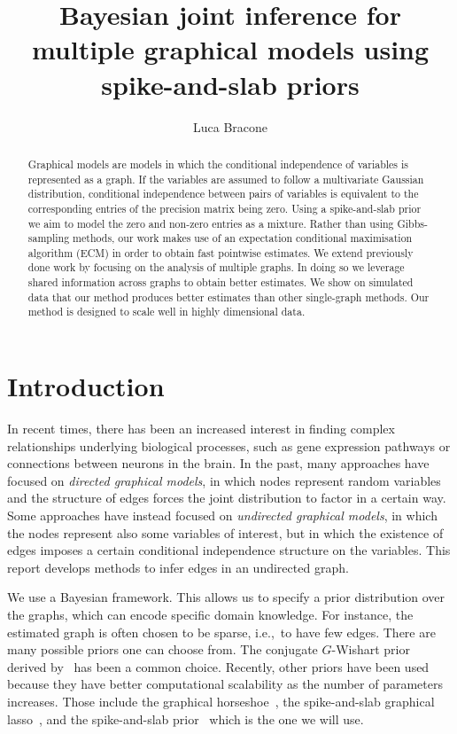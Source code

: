 \documentclass[a4paper, 11pt, oneside]{report}
\author{Luca Bracone}
\title{Bayesian joint inference for multiple graphical models using
	spike-and-slab priors}
\newcommand{\1}{\mathds{1}}
\begin{document}
\maketitle

\begin{abstract}
	Graphical models are models in which the conditional independence of
	variables is represented as a graph. If the variables are assumed to  follow
	a multivariate Gaussian distribution, conditional
	independence between pairs of variables is equivalent to the corresponding entries of the precision matrix being zero. Using a
	spike-and-slab prior we aim to model the zero and
	non-zero entries as a mixture. Rather than using Gibbs-sampling methods, our work makes
	use of an expectation conditional maximisation algorithm (ECM) in order to
	obtain fast pointwise estimates. We extend previously done work by focusing
	on the analysis of multiple graphs. In doing so we leverage shared
	information across graphs to obtain better estimates. We show on simulated
	data that our method produces better estimates than other single-graph
	methods. Our method is designed to scale well in highly dimensional data.

\end{abstract}

\chapter{Introduction}
In recent times, there has been an increased interest in finding complex
relationships underlying biological processes, such as gene expression pathways
or connections between neurons in the brain. In the past, many approaches have
focused on \emph{directed graphical models}, in which nodes represent random
variables and the structure of edges forces the joint distribution to factor in
a certain way. Some approaches have instead focused on \emph{undirected
	graphical models}, in which the nodes represent also some variables of interest, but
in which the existence of edges imposes a certain conditional independence
structure on the variables. This report develops methods to infer edges in an
undirected graph.

We use a Bayesian framework. This allows us to specify a prior distribution over the
graphs, which can encode specific domain knowledge. For instance, the estimated
graph is often chosen to be sparse, i.e.,\ to have few edges.
There are many possible priors one can choose from.
The conjugate $G$-Wishart prior derived by~\citet{HyperInverseWRovera2002}
has been a common choice.
Recently, other priors have been used because they have
better computational scalability as the number of parameters increases.
Those include the graphical horseshoe~\citep{yunf2019}, the spike-and-slab
graphical lasso~\citep{limm2018}, and the
spike-and-slab prior~\citep{wang-2015} which is the one we will use.
\end{document}

